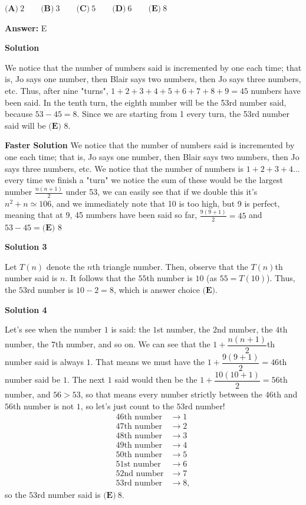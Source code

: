 \begin{enumerate}
 $\textbf{(A)}\ 2 \qquad \textbf{(B)}\ 3 \qquad \textbf{(C)}\ 5 \qquad \textbf{(D)}\ 6 \qquad \textbf{(E)}\ 8$

 \textbf{Answer: }E



\textbf{Solution}

We notice that the number of numbers said is incremented by one each time; that is, Jo says one number, then Blair says two numbers, then Jo says three numbers, etc.  Thus, after nine "turns", $1+2+3+4+5+6+7+8+9=45$ numbers have been said.  In the tenth turn, the eighth number will be the 53rd number said, because $53-45=8$.  Since we are starting from 1 every turn, the 53rd number said will be $\boxed{\textbf{(E) }8}$.

 \textbf{Faster Solution} We notice that the number of numbers said is incremented by one each time; that is, Jo says one number, then Blair says two numbers, then Jo says three numbers, etc.  We notice that the number of numbers is $1 + 2 + 3 + 4 ...$ every time we finish a "turn" we notice the sum of these would be the largest number $\frac{n(n+1)}{2}$ under 53, we can easily see that if we double this it's $n^2 + n \simeq 106$, and we immediately note that 10 is too high, but 9 is perfect, meaning that at 9, 45 numbers have been said so far, $\frac{9(9+1)}{2} = 45$ and $53 - 45 = \boxed{\textbf{(E) }8}$




\textbf{Solution 3}

Let $T(n)$ denote the $n$th triangle number. Then, observe that the $T(n)$th number said is $n$. It follows that the $55$th number is $10$ (as $55 = T(10)$). Thus, the $53$rd number is $10 - 2 = 8$, which is answer choice $\boxed{\textbf{(E)}}$.

 



\textbf{Solution 4}

Let's see when the number $1$ is said: the $1$st number, the $2$nd number, the $4$th number, the $7$th number, and so on. We can see that the $1+\dfrac{n(n+1)}2$th number said is always $1$. That means we must have the $1+\dfrac{9(9+1)}2=46$th number said be $1$. The next $1$ said would then be the $1+\dfrac{10(10+1)}2=56$th number, and $56>53$, so that means every number strictly between the $46$th and $56$th number is not $1$, so let's just count to the $53$rd number!
 \begin{align*}     46\text{th number}&\rightarrow 1\\     47\text{th number}&\rightarrow 2\\     48\text{th number}&\rightarrow 3\\     49\text{th number}&\rightarrow 4\\     50\text{th number}&\rightarrow 5\\     51\text{st number}&\rightarrow 6\\     52\text{nd number}&\rightarrow 7\\     53\text{rd number}&\rightarrow 8, \end{align*}
so the $53$rd number said is $\boxed{\textbf{(E)}\ 8}$.


\end{enumerate}
